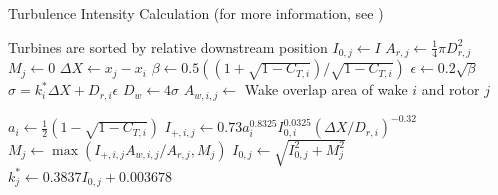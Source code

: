 \documentclass[conf]{new-aiaa}
\begin{document}
%
% 
\begin{algorithm} \label{alg:ti}
	\caption{Turbulence Intensity Calculation (for more information, see \cite{niayifar2016})}
   \label{alg:ti}
   \begin{algorithmic}
   \Ensure Turbines are sorted by relative downstream position
      
   	\State $I_{0,j} \gets I$ 
    \State $A_{r,j} \gets \frac{1}{4}\pi D_{r,j}^2$ 
    \State $M_j \gets 0$
          
         	\State $\Delta X \gets x_j - x_i$ 
               \State $\beta \gets 0.5((1+\sqrt{1-C_{T,i}})/\sqrt{1-C_{T,i}})$
               \State $\epsilon \gets 0.2 \sqrt{\beta}$
               \State $\sigma = k_i^*\Delta X+D_{r,i}\epsilon$
               \State $D_w \gets 4\sigma$
               \State $A_{w,i,j} \gets$ Wake overlap area of wake $i$ and rotor $j$ 
               
               \State $a_i \gets  \frac{1}{2}(1-\sqrt{1-C_{T,i}})$
               \State $I_{+,i,j} \gets 0.73 a_{i}^{0.8325} I_{0,i}^{0.0325} (\Delta X/D_{r,i})^{-0.32}$
               \State $M_j \gets \max{(I_{+,i,j}A_{w,i,j}/A_{r,j}, M_j)}$ 
        	\EndIf
        \EndFor
        \State $I_{0,j} \gets \sqrt{I_{0,j}^2 + M_j^2}$ 
        \State $k_j^* \gets 0.3837I_{0,j}+0.003678 $ 
     \EndFor
   \end{algorithmic}    
\end{algorithm}
\end{document}
